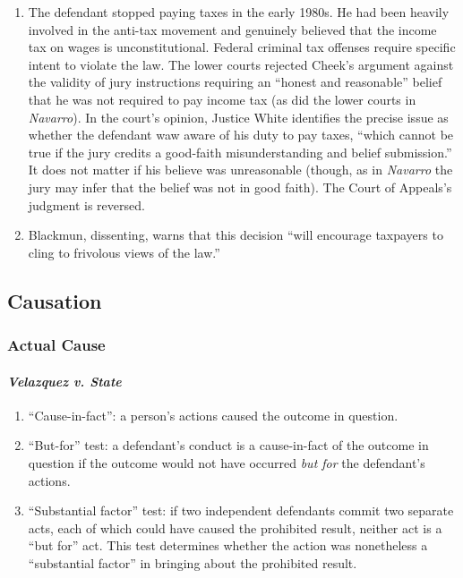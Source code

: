 \begin{enumerate}
    \item The defendant stopped paying taxes in the early 1980s. He had been heavily involved in the anti-tax movement and genuinely believed that the income tax on wages is unconstitutional. Federal criminal tax offenses require specific intent to violate the law. The lower courts rejected Cheek's argument against the validity of jury instructions requiring an ``honest and reasonable'' belief that he was not required to pay income tax (as did the lower courts in \emph{Navarro}). In the court's opinion, Justice White identifies the precise issue as whether the defendant waw aware of his duty to pay taxes, ``which cannot be true if the jury credits a good-faith misunderstanding and belief submission.'' It does not matter if his believe was unreasonable (though, as in \emph{Navarro} the jury may infer that the belief was not in good faith). The Court of Appeals's judgment is reversed.
    \item Blackmun, dissenting, warns that this decision ``will encourage taxpayers to cling to frivolous views of the law.''
\end{enumerate}

\subsection{Causation}

\subsubsection{Actual Cause}

\paragraph{\emph{Velazquez v. State}}

\begin{enumerate}
    \item ``Cause-in-fact'': a person's actions caused the outcome in question.
    \item ``But-for'' test: a defendant's conduct is a cause-in-fact of the outcome in question if the outcome would not have occurred \emph{but for} the defendant's actions.
    \item ``Substantial factor'' test: if two independent defendants commit two separate acts, each of which could have caused the prohibited result, neither act is a ``but for'' act. This test determines whether the action was nonetheless a ``substantial factor'' in bringing about the prohibited result.
\end{enumerate}


